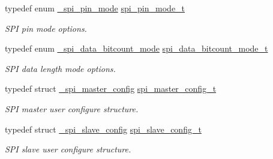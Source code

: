 \begin{DoxyCompactItemize}
\mbox{\label{group__spi__driver_ga4d2e20ceaf81868a429938113afe8726}} 
typedef enum \mbox{\hyperlink{group__spi__driver_ga014ab448d5b79e6cf5b9ffb11c3d0729}{\+\_\+spi\+\_\+pin\+\_\+mode}} \mbox{\hyperlink{group__spi__driver_ga4d2e20ceaf81868a429938113afe8726}{spi\+\_\+pin\+\_\+mode\+\_\+t}}
\begin{DoxyCompactList}\small\item\em S\+PI pin mode options. \end{DoxyCompactList}\item 
\mbox{\label{group__spi__driver_gac7eb20f2509999c1daa274c03c4a29b3}} 
typedef enum \mbox{\hyperlink{group__spi__driver_ga1e6f95a831fb9323a32a9676ef049813}{\+\_\+spi\+\_\+data\+\_\+bitcount\+\_\+mode}} \mbox{\hyperlink{group__spi__driver_gac7eb20f2509999c1daa274c03c4a29b3}{spi\+\_\+data\+\_\+bitcount\+\_\+mode\+\_\+t}}
\begin{DoxyCompactList}\small\item\em S\+PI data length mode options. \end{DoxyCompactList}\item 
\mbox{\label{group__spi__driver_ga15e5f834f83ba89de1e920bba9d00394}} 
typedef struct \mbox{\hyperlink{struct__spi__master__config}{\+\_\+spi\+\_\+master\+\_\+config}} \mbox{\hyperlink{group__spi__driver_ga15e5f834f83ba89de1e920bba9d00394}{spi\+\_\+master\+\_\+config\+\_\+t}}
\begin{DoxyCompactList}\small\item\em S\+PI master user configure structure. \end{DoxyCompactList}\item 
\mbox{\label{group__spi__driver_gaa62352a5d0a01f70fe74941809d03ec3}} 
typedef struct \mbox{\hyperlink{struct__spi__slave__config}{\+\_\+spi\+\_\+slave\+\_\+config}} \mbox{\hyperlink{group__spi__driver_gaa62352a5d0a01f70fe74941809d03ec3}{spi\+\_\+slave\+\_\+config\+\_\+t}}
\begin{DoxyCompactList}\small\item\em S\+PI slave user configure structure. \end{DoxyCompactList}\item 
\mbox{\label{group__spi__driver_ga59314d5596f240cfbe8b9466bd99ed3f}} 

\end{DoxyCompactItemize}
